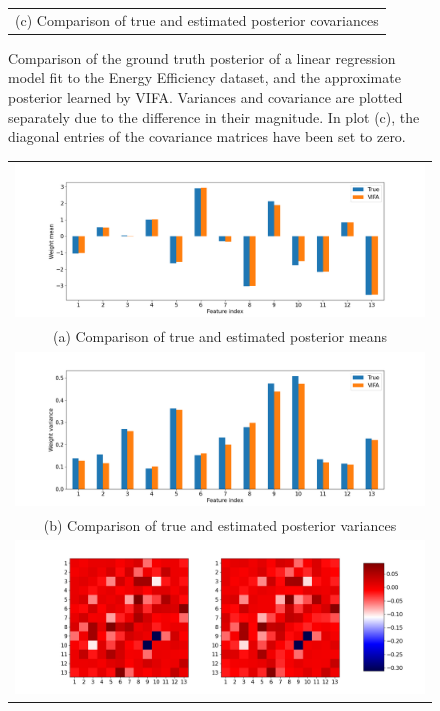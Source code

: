 \documentclass[msc,deptreport.inf]{infthesis} %
\begin{document}
\begin{figure}[!htbp]
\begin{tabular}{c}
		(c) Comparison of true and estimated posterior covariances \\[6pt] 
	\end{tabular}
	\caption{Comparison of the ground truth posterior of a linear regression model fit to the Energy Efficiency dataset, and the approximate posterior learned by VIFA. Variances and covariance are plotted separately due to the difference in their magnitude. In plot (c), the diagonal entries of the covariance matrices have been set to zero.}
	\label{fig:posterior_energy_efficiency}
\end{figure}

\begin{figure}[!htbp] 
	\begin{tabular}{c}
		\includegraphics[width=140mm]{plots/boston_housing_posterior_mean.png} \\
		(a) Comparison of true and estimated posterior means \\[6pt] 
		 \includegraphics[width=140mm]{plots/boston_housing_posterior_variance.png} \\
		(b) Comparison of true and estimated posterior variances \\[6pt] 
		\includegraphics[width=140mm]{plots/boston_housing_posterior_covariance.png} \\

\end{tabular}
\end{figure}
\end{document}
